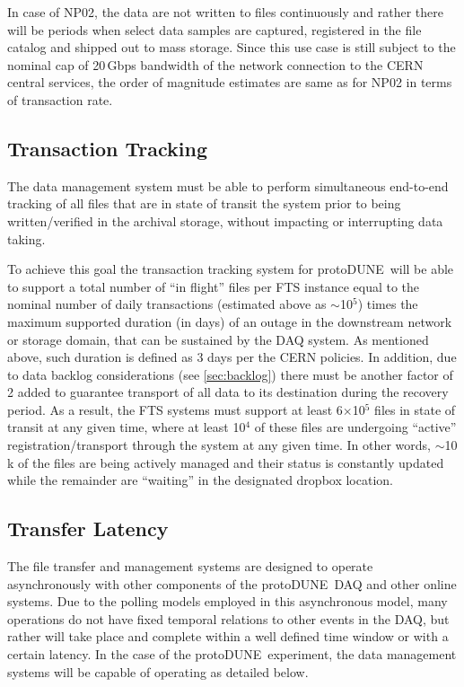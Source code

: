 \documentclass[pdftex,12pt,letter]{article}
\newcommand{\pd}{protoDUNE\ }
\begin{document}
In case of NP02, the data are not written to files continuously and rather there will be periods when
select data samples are captured, registered in the file catalog and shipped out to mass storage.
Since this use case is still subject to the nominal cap of 20\,Gbps bandwidth of the network connection
to the CERN central services, the order of magnitude estimates are same as for NP02 in terms of transaction rate.

\subsection{Transaction Tracking}
The data management system must be able to perform simultaneous end-to-end tracking
of all files that are in state of transit the system prior to being written/verified in the archival storage,
without impacting or interrupting data taking. 

To achieve this goal the transaction tracking system for \pd will be
able to support a total number of ``in flight'' files per FTS instance equal to the nominal number of daily transactions
(estimated above as $\sim$10$^5$) times the maximum supported duration (in days)
of an outage in the downstream network or storage domain, that can be sustained by the DAQ system.
As mentioned above, such duration is defined as 3 days per the CERN policies. In addition, due to data backlog considerations
(see \ref{sec:backlog}) there must be another factor of 2 added to guarantee transport of all data to its destination during
the recovery period. As a result, the FTS systems must support at least 6$\times$10$^5$ files in state of transit at any given time,
where at least 10$^4$ of these files are undergoing ``active'' registration/transport through the system at any given time.
In other words, $\sim$10\,k of the files are being actively
managed and their status is constantly updated while the remainder are ``waiting'' in the designated dropbox location.

\subsection{Transfer Latency}
The file transfer and management systems are designed to operate asynchronously with other components of the \pd DAQ
and other online systems.
Due to the polling models employed in this asynchronous model, many operations do not have fixed temporal relations to other events in the DAQ,
but rather will take place and complete within a well defined time window or with a certain latency.  In the case of the \pd experiment,
the data management systems will be capable of operating as detailed below.
\end{document}
